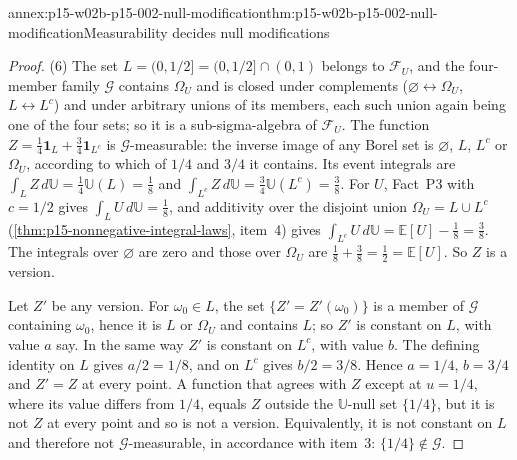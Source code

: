 \begin{annexitem}{annex:p15-w02b-p15-002-null-modification}{thm:p15-w02b-p15-002-null-modification}{Measurability decides null modifications}
\begin{proof}
(6) The set \(L=(0,1/2]=(0,1/2]\cap(0,1)\) belongs to \(\mathcal F_U\),
and the four-member family \(\mathcal G\) contains \(\Omega_U\) and is
closed under complements (\(\varnothing\leftrightarrow\Omega_U\),
\(L\leftrightarrow L^c\)) and under arbitrary unions of its members,
each such union again being one of the four sets; so it is a
sub-sigma-algebra of \(\mathcal F_U\). The function
\(Z=\tfrac14\mathbf1_L+\tfrac34\mathbf1_{L^c}\) is
\(\mathcal G\)-measurable: the inverse image of any Borel set is
\(\varnothing\), \(L\), \(L^c\) or \(\Omega_U\), according to which of
\(1/4\) and \(3/4\) it contains. Its event integrals are
\(\int_LZ\,d\mathbb U=\tfrac14\mathbb U(L)=\tfrac18\) and
\(\int_{L^c}Z\,d\mathbb U=\tfrac34\mathbb U(L^c)=\tfrac38\). For \(U\),
Fact~P3 with \(c=1/2\) gives \(\int_LU\,d\mathbb U=\tfrac18\), and
additivity over the disjoint union \(\Omega_U=L\cup L^c\)
(\cref{thm:p15-nonnegative-integral-laws}, item~4) gives
\(\int_{L^c}U\,d\mathbb U=\mathbb E[U]-\tfrac18=\tfrac38\). The
integrals over \(\varnothing\) are zero and those over \(\Omega_U\) are
\(\tfrac18+\tfrac38=\tfrac12=\mathbb E[U]\). So \(Z\) is a version.

Let \(Z'\) be any version. For \(\omega_0\in L\), the set
\(\{Z'=Z'(\omega_0)\}\) is a member of \(\mathcal G\) containing
\(\omega_0\), hence it is \(L\) or \(\Omega_U\) and contains \(L\); so
\(Z'\) is constant on \(L\), with value \(a\) say. In the same way
\(Z'\) is constant on \(L^c\), with value \(b\). The defining identity on
\(L\) gives \(a/2=1/8\), and on \(L^c\) gives \(b/2=3/8\). Hence
\(a=1/4\), \(b=3/4\) and \(Z'=Z\) at every point. A function that
agrees with \(Z\) except at \(u=1/4\), where its value differs from
\(1/4\), equals \(Z\) outside the \(\mathbb U\)-null set \(\{1/4\}\),
but it is not \(Z\) at every point and so is not a version. Equivalently,
it is not constant on \(L\) and therefore not \(\mathcal G\)-measurable,
in accordance with item~3: \(\{1/4\}\notin\mathcal G\).
\end{proof}
\end{annexitem}
